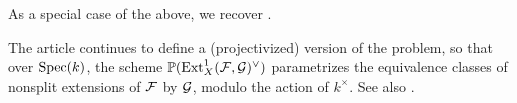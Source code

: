 \begin{remark}
As a special case of the above, we recover .
\end{remark}

\begin{remark}
	The article \cite{lange-universal-extensions} continues to define a (projectivized) version of the problem, so that over $\operatorname{Spec}(k)$, the scheme $\mathbb{P}(\operatorname{Ext}^1_X(\mathcal{F},\mathcal{G})^\vee)$ parametrizes the equivalence classes of nonsplit extensions of $\mathcal{F}$ by $\mathcal{G}$, modulo the action of $k^{\times}$. See also \cite[Example 2.1.12]{huybrechts-lehn-sheaves}.
\end{remark}

